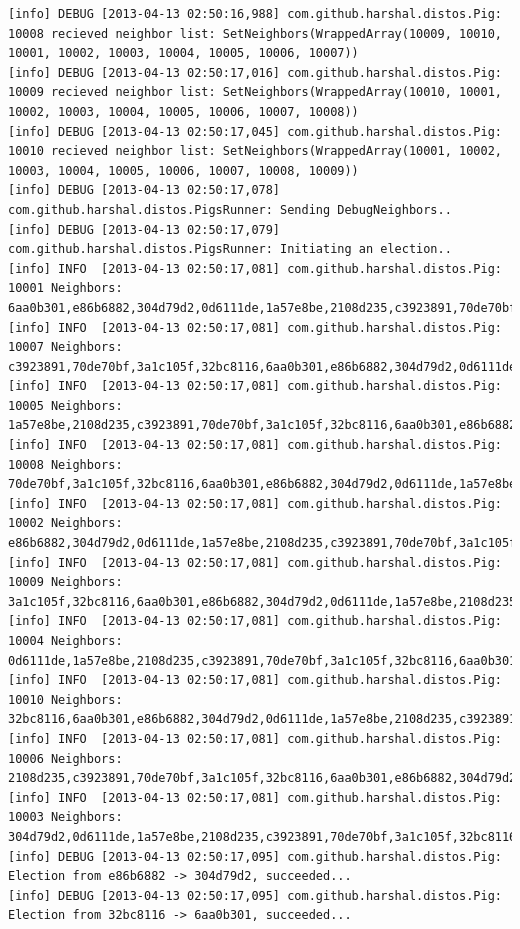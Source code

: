 \documentclass[]{article}
\begin{document}
\begin{verbatim}
[info] DEBUG [2013-04-13 02:50:16,988] com.github.harshal.distos.Pig: 10008 recieved neighbor list: SetNeighbors(WrappedArray(10009, 10010, 10001, 10002, 10003, 10004, 10005, 10006, 10007))
[info] DEBUG [2013-04-13 02:50:17,016] com.github.harshal.distos.Pig: 10009 recieved neighbor list: SetNeighbors(WrappedArray(10010, 10001, 10002, 10003, 10004, 10005, 10006, 10007, 10008))
[info] DEBUG [2013-04-13 02:50:17,045] com.github.harshal.distos.Pig: 10010 recieved neighbor list: SetNeighbors(WrappedArray(10001, 10002, 10003, 10004, 10005, 10006, 10007, 10008, 10009))
[info] DEBUG [2013-04-13 02:50:17,078] com.github.harshal.distos.PigsRunner: Sending DebugNeighbors..
[info] DEBUG [2013-04-13 02:50:17,079] com.github.harshal.distos.PigsRunner: Initiating an election..
[info] INFO  [2013-04-13 02:50:17,081] com.github.harshal.distos.Pig: 10001 Neighbors: 6aa0b301,e86b6882,304d79d2,0d6111de,1a57e8be,2108d235,c3923891,70de70bf,3a1c105f
[info] INFO  [2013-04-13 02:50:17,081] com.github.harshal.distos.Pig: 10007 Neighbors: c3923891,70de70bf,3a1c105f,32bc8116,6aa0b301,e86b6882,304d79d2,0d6111de,1a57e8be
[info] INFO  [2013-04-13 02:50:17,081] com.github.harshal.distos.Pig: 10005 Neighbors: 1a57e8be,2108d235,c3923891,70de70bf,3a1c105f,32bc8116,6aa0b301,e86b6882,304d79d2
[info] INFO  [2013-04-13 02:50:17,081] com.github.harshal.distos.Pig: 10008 Neighbors: 70de70bf,3a1c105f,32bc8116,6aa0b301,e86b6882,304d79d2,0d6111de,1a57e8be,2108d235
[info] INFO  [2013-04-13 02:50:17,081] com.github.harshal.distos.Pig: 10002 Neighbors: e86b6882,304d79d2,0d6111de,1a57e8be,2108d235,c3923891,70de70bf,3a1c105f,32bc8116
[info] INFO  [2013-04-13 02:50:17,081] com.github.harshal.distos.Pig: 10009 Neighbors: 3a1c105f,32bc8116,6aa0b301,e86b6882,304d79d2,0d6111de,1a57e8be,2108d235,c3923891
[info] INFO  [2013-04-13 02:50:17,081] com.github.harshal.distos.Pig: 10004 Neighbors: 0d6111de,1a57e8be,2108d235,c3923891,70de70bf,3a1c105f,32bc8116,6aa0b301,e86b6882
[info] INFO  [2013-04-13 02:50:17,081] com.github.harshal.distos.Pig: 10010 Neighbors: 32bc8116,6aa0b301,e86b6882,304d79d2,0d6111de,1a57e8be,2108d235,c3923891,70de70bf
[info] INFO  [2013-04-13 02:50:17,081] com.github.harshal.distos.Pig: 10006 Neighbors: 2108d235,c3923891,70de70bf,3a1c105f,32bc8116,6aa0b301,e86b6882,304d79d2,0d6111de
[info] INFO  [2013-04-13 02:50:17,081] com.github.harshal.distos.Pig: 10003 Neighbors: 304d79d2,0d6111de,1a57e8be,2108d235,c3923891,70de70bf,3a1c105f,32bc8116,6aa0b301
[info] DEBUG [2013-04-13 02:50:17,095] com.github.harshal.distos.Pig: Election from e86b6882 -> 304d79d2, succeeded...
[info] DEBUG [2013-04-13 02:50:17,095] com.github.harshal.distos.Pig: Election from 32bc8116 -> 6aa0b301, succeeded...

\end{verbatim}
\end{document}
